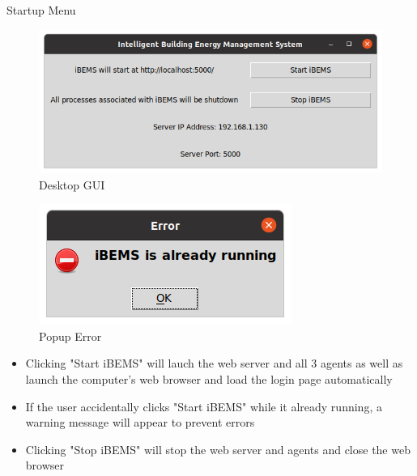 \documentclass{beamer}
\begin{document}
\begin{frame}{Startup Menu}
    \begin{multicols}{2}
        \begin{figure}
            \centering
            \includegraphics[scale=0.2]{figs/GUI/BEMS_GUI_Linux.png}
            \caption{Desktop GUI}
            \label{fig:desktopgui}
        \end{figure}
        \begin{figure}
            \centering
            \includegraphics[scale=0.35]{figs/GUI/BEMS_GUI_Linux_Warning.png}
            \caption{Popup Error}
            \label{fig:popuperror}
        \end{figure}
    \end{multicols}
    \begin{block}{}
      \begin{itemize}
        \item Clicking "Start iBEMS" will lauch the web server and all 3 agents as well as launch the computer's web browser and load the login page automatically
        \item If the user accidentally clicks "Start iBEMS" while it already running, a warning message will appear to prevent errors
        \item Clicking "Stop iBEMS" will stop the web server and agents and close the web browser
    \end{itemize}
    \end{block}
\end{frame}
\end{document}
